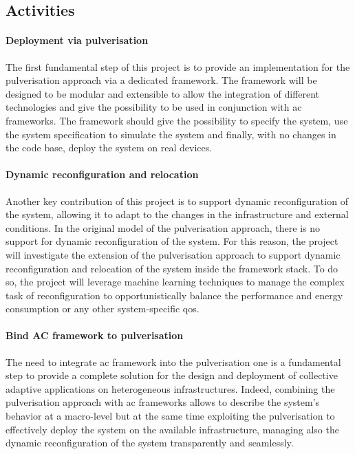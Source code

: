 \documentclass[12pt]{article}
\begin{document}
\subsection{Activities}\label{subsec:activities}

\paragraph{Deployment via pulverisation}
The first fundamental step of this project is to provide an implementation for
the pulverisation approach via a dedicated framework.
%
The framework will be designed to be modular and extensible to allow the integration
of different technologies and give the possibility to be used in conjunction with
\ac{ac} frameworks.
%
The framework should give the possibility to specify the system,
use the system specification to simulate the system
and finally, with no changes in the code base,
deploy the system on real devices.

\paragraph{Dynamic reconfiguration and relocation}
Another key contribution of this project is to support dynamic reconfiguration of the system,
allowing it to adapt to the changes in the infrastructure and external conditions.
%
In the original model of the pulverisation approach,
there is no support for dynamic reconfiguration of the system.
%
For this reason,
the project will investigate the extension of the pulverisation approach
to support dynamic reconfiguration and relocation of the system inside the framework stack.
%
To do so,
the project will leverage machine learning techniques to manage the complex task of reconfiguration
to opportunistically balance the performance and energy consumption or any other system-specific \ac{qos}.

\paragraph{Bind AC framework to pulverisation}
The need to integrate \ac{ac} framework into the pulverisation one is
a fundamental step to provide a complete solution for the design and deployment of
collective adaptive applications on heterogeneous infrastructures.
%
Indeed, combining the pulverisation approach with \ac{ac} frameworks
allows to describe the system's behavior at a macro-level
but at the same time exploiting the pulverisation to
effectively deploy the system on the available infrastructure,
managing also the dynamic reconfiguration of the system transparently and seamlessly.
\end{document}
